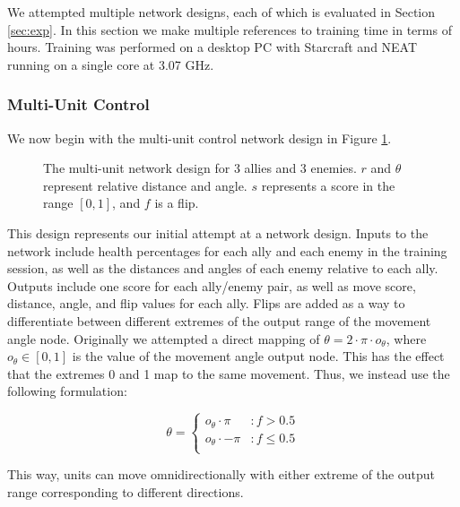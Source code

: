 \documentclass[10pt,a4paper,twocolumn]{article}
\begin{document}
We attempted multiple network designs, each of which is evaluated in Section \ref{sec:exp}. In this section we make multiple references to training time in terms of hours. Training was performed on a desktop PC with Starcraft and NEAT running on a single core at 3.07 GHz. 

\subsubsection{Multi-Unit Control}
\label{sec:multiunit_design}

We now begin with the multi-unit control network design in Figure \ref{fig:design_multiunit}.

\begin{figure}

\caption{The multi-unit network design for 3 allies and 3 enemies. $r$ and $\theta$ represent relative distance and angle. $s$ represents a score in the range $[0,1]$, and $f$ is a flip.}
\label{fig:design_multiunit}
\end{figure}

This design represents our initial attempt at a network design. Inputs to the network include health percentages for each ally and each enemy in the training session, as well as the distances and angles of each enemy relative to each ally. Outputs include one score for each ally/enemy pair, as well as move score, distance, angle, and flip values for each ally. Flips are added as a way to differentiate between different extremes of the output range of the movement angle node. Originally we attempted a direct mapping of $\theta = 2 \cdot \pi \cdot o_\theta$, where $o_\theta \in [0,1]$ is the value of the movement angle output node. This has the effect that the extremes 0 and 1 map to the same movement. Thus, we instead use the following formulation:

 \begin{displaymath}
   \theta = \left\{
     \begin{array}{lr}
       o_\theta \cdot \pi & : f > 0.5\\
       o_\theta \cdot -\pi & : f \leq 0.5\\
     \end{array}
   \right.
\end{displaymath}

This way, units can move omnidirectionally with either extreme of the output range corresponding to different directions.
\end{document}
